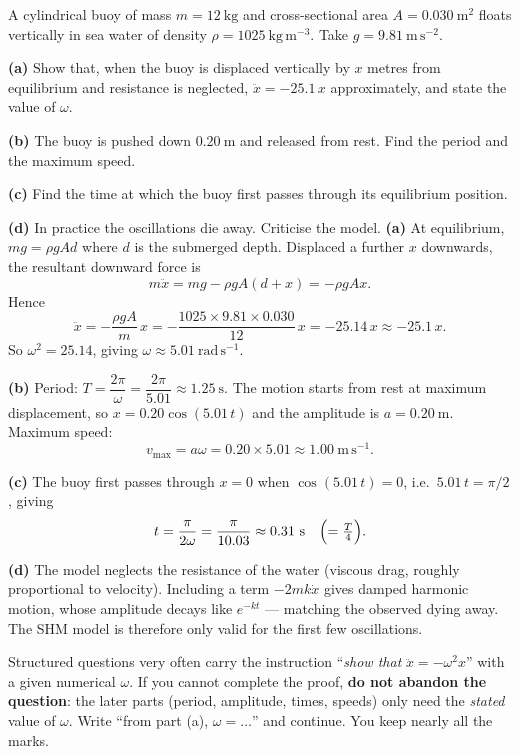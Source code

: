 \documentclass[11pt]{article}
\begin{document}
\begin{exoresolu}
A cylindrical buoy of mass $m = 12\ \mathrm{kg}$ and cross-sectional area $A = 0.030\ \mathrm{m^{2}}$ floats vertically in sea water of density $\rho = 1025\ \mathrm{kg\,m^{-3}}$. Take $g = 9.81\ \mathrm{m\,s^{-2}}$.

\textbf{(a)} Show that, when the buoy is displaced vertically by $x$ metres from equilibrium and resistance is neglected, $\ddot{x} = -25.1\,x$ approximately, and state the value of $\omega$.

\textbf{(b)} The buoy is pushed down $0.20\ \mathrm{m}$ and released from rest. Find the period and the maximum speed.

\textbf{(c)} Find the time at which the buoy first passes through its equilibrium position.

\textbf{(d)} In practice the oscillations die away. Criticise the model.
\tcblower
\textbf{(a)} At equilibrium, $mg = \rho g A d$ where $d$ is the submerged depth. Displaced a further $x$ downwards, the resultant downward force is
\[
m\ddot{x} = mg - \rho g A(d+x) = -\rho g A x.
\]
Hence
\[
\ddot{x} = -\frac{\rho g A}{m}\,x = -\frac{1025 \times 9.81 \times 0.030}{12}\,x = -25.14\,x \approx -25.1\,x.
\]
So $\omega^{2} = 25.14$, giving $\omega \approx 5.01\ \mathrm{rad\,s^{-1}}$.

\textbf{(b)} Period: $T = \dfrac{2\pi}{\omega} = \dfrac{2\pi}{5.01} \approx 1.25\ \mathrm{s}$. The motion starts from rest at maximum displacement, so $x = 0.20\cos(5.01\,t)$ and the amplitude is $a = 0.20\ \mathrm{m}$. Maximum speed:
\[
v_{\max} = a\omega = 0.20 \times 5.01 \approx 1.00\ \mathrm{m\,s^{-1}}.
\]

\textbf{(c)} The buoy first passes through $x = 0$ when $\cos(5.01\,t) = 0$, i.e.\ $5.01\,t = \pi/2$, giving
\[
t = \frac{\pi}{2\omega} = \frac{\pi}{10.03} \approx 0.31\ \mathrm{s} \quad \Bigl(= \tfrac{T}{4}\Bigr).
\]

\textbf{(d)} The model neglects the resistance of the water (viscous drag, roughly proportional to velocity). Including a term $-2mk\dot{x}$ gives damped harmonic motion, whose amplitude decays like $e^{-kt}$ — matching the observed dying away. The SHM model is therefore only valid for the first few oscillations.
\end{exoresolu}

\begin{attention}
Structured questions very often carry the instruction ``\emph{show that} $\ddot{x} = -\omega^{2}x$'' with a given numerical $\omega$. If you cannot complete the proof, \textbf{do not abandon the question}: the later parts (period, amplitude, times, speeds) only need the \emph{stated} value of $\omega$. Write ``from part (a), $\omega = \ldots$'' and continue. You keep nearly all the marks.
\end{attention}
\end{document}
